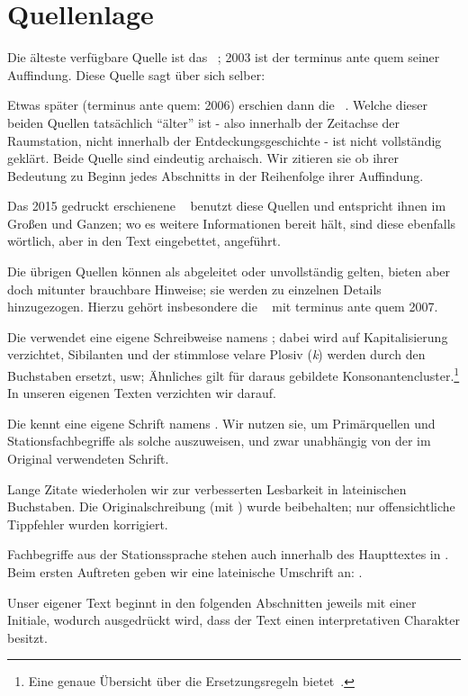 \section*{Quellenlage}
\fancyhead[LO]{}

Die älteste verfügbare Quelle ist das ~\cite{cbasestarbasemanual}; 2003 ist der terminus ante quem seiner Auffindung. Diese Quelle sagt über sich selber:

Etwas später (terminus ante quem: 2006) erschien dann die ~\cite{ctour}. Welche dieser beiden Quellen tatsächlich "`älter"' ist - also innerhalb der Zeitachse der Raumstation, nicht innerhalb der Entdeckungsgeschichte - ist nicht vollständig geklärt. Beide Quelle sind eindeutig archaisch.  Wir zitieren sie ob ihrer Bedeutung zu Beginn jedes Abschnitts in der Reihenfolge ihrer Auffindung.

Das 2015 gedruckt erschienene ~\cite{cbasebook} benutzt diese Quellen und entspricht ihnen im Großen und Ganzen; wo es weitere Informationen bereit hält, sind diese ebenfalls wörtlich, aber in den Text eingebettet, angeführt. 

Die übrigen Quellen können als abgeleitet oder unvollständig gelten, bieten aber doch mitunter brauchbare Hinweise; sie werden zu einzelnen Details hinzugezogen. Hierzu gehört  insbesondere die ~\cite{cbasepressemap} mit terminus ante quem 2007. 

Die  verwendet eine eigene Schreibweise namens  ; dabei wird auf Kapitalisierung verzichtet,  Sibilanten und der stimmlose velare Plosiv (\emph{k}) werden durch den Buchstaben  ersetzt, usw; Ähnliches gilt für daraus gebildete  Konsonantencluster.\footnote{Eine genaue Übersicht über die Ersetzungsregeln bietet~\cite[S.~46]{cbasebook}.} In unseren eigenen Texten verzichten wir darauf.

Die  kennt eine eigene Schrift namens . Wir nutzen sie, um Primärquellen und Stationsfachbegriffe als solche auszuweisen, und zwar unabhängig von der im Original verwendeten Schrift. 

Lange Zitate wiederholen wir zur verbesserten Lesbarkeit in lateinischen Buchstaben. Die Originalschreibung (mit ) wurde beibehalten; nur offensichtliche Tippfehler wurden korrigiert. 

Fachbegriffe aus der Stationssprache stehen auch innerhalb des Haupttextes in . Beim ersten Auftreten geben wir eine lateinische Umschrift an: . 

Unser eigener Text beginnt in den folgenden Abschnitten jeweils mit einer Initiale, wodurch ausgedrückt wird, dass der Text einen interpretativen Charakter besitzt.



